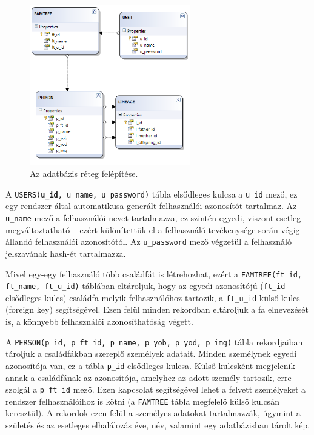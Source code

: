 \begin{figure}[!ht]
\centering
\includegraphics[width=70mm, keepaspectratio]{figures/db_sema.png}
\caption{Az adatbázis réteg felépítése.}
\label{fig:db_sema}
\end{figure}

A \texttt{USERS(\textbf{u\_id}, u\_name, u\_password)} tábla elsődleges kulcsa a \texttt{u\_id} mező, ez egy rendszer által automatikusa generált felhasználói azonosítót tartalmaz. Az \texttt{u\_name} mező a felhasználói nevet tartalmazza, ez szintén egyedi, viszont esetleg megváltoztatható -- ezért különítettük el a felhasználó tevékenysége során végig állandó felhasználói azonosítótól. Az \texttt{u\_password} mező végzetül a felhasználó jelszavának hash-ét tartalmazza.

Mivel egy-egy felhasználó több családfát is létrehozhat, ezért a \texttt{FAMTREE(ft\_id, ft\_name, ft\_u\_id)} táblában eltároljuk, hogy az egyedi azonosítójú (\texttt{ft\_id} -- elsődleges kulcs) családfa melyik felhasználóhoz tartozik, a \texttt{ft\_u\_id} külső kulcs (foreign key) segítségével. Ezen felül minden rekordban eltároljuk a fa elnevezését is, a könnyebb felhasználói azonosíthatóság végett.

A \texttt{PERSON(p\_id, p\_ft\_id, p\_name, p\_yob, p\_yod, p\_img)} tábla rekordjaiban tároljuk a családfákban szereplő személyek adatait. Minden személynek egyedi azonosítója van, ez a tábla \texttt{p\_id} elsődleges kulcsa. Külső kulcsként megjelenik annak a családfának az azonosítója, amelyhez az adott személy tartozik, erre szolgál a \texttt{p\_ft\_id} mező. Ezen kapcsolat segítségével lehet a felvett személyeket a rendszer felhasználóihoz is kötni (a \texttt{FAMTREE} tábla megfelelő külső kulcsán keresztül). A rekordok ezen felül a személyes adatokat tartalmazzák, úgymint a születés és az esetleges elhalálozás éve, név, valamint egy adatbázisban tárolt kép.

